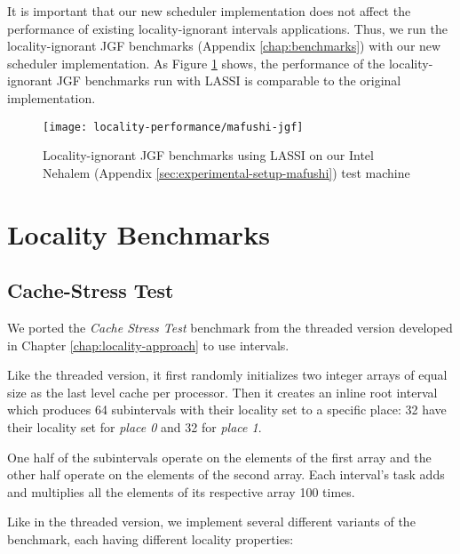 It is important that our new scheduler implementation does not affect
the performance of existing locality-ignorant intervals
applications. Thus, we run the locality-ignorant JGF benchmarks
(Appendix \ref{chap:benchmarks}) with our new scheduler
implementation. As Figure \ref{fig:locality-performance-jgf} shows,
the performance of the locality-ignorant JGF benchmarks run with LASSI
is comparable to the original implementation.

\begin{figure}[!ht]
  \centering
  \texttt{[image: locality-performance/mafushi-jgf]}
  \caption[Locality-ignorant JGF benchmarks]{Locality-ignorant JGF
    benchmarks using LASSI on our Intel Nehalem (Appendix
    \ref{sec:experimental-setup-mafushi}) test machine}
  \label{fig:locality-performance-jgf}
\end{figure}


\section{Locality Benchmarks}
\label{sec:locality-performance-locality}

\subsection{Cache-Stress Test}
\label{sec:locality-performance-cache-stress-test}

We ported the \emph{Cache Stress Test} benchmark from the threaded
version developed in Chapter \ref{chap:locality-approach} to use
intervals.

Like the threaded version, it first randomly initializes two integer
arrays of equal size as the last level cache per processor. Then it
creates an inline root interval which produces 64 subintervals with
their locality set to a specific place: 32 have their locality set for
\emph{place 0} and 32 for \emph{place 1}.

One half of the subintervals operate on the elements of the first
array and the other half operate on the elements of the second
array. Each interval's task adds and multiplies all the elements of
its respective array 100 times.

Like in the threaded version, we implement several different variants
of the benchmark, each having different locality properties:


